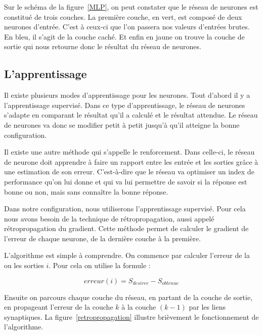 \documentclass[11pt]{report}
\begin{document}
Sur le schéma de la figure~\ref{MLP}, on peut constater que le réseau de neurones est constitué de trois couches. La première couche, en vert, est composé de deux neurones d'entrée. C'est à ceux-ci que l'on passera nos valeurs d'entrées brutes. En bleu, il s'agit de la couche caché. Et enfin en jaune on trouve la couche de sortie qui nous retourne donc le résultat du réseau de neurones.

\subsection{L'apprentissage}

Il existe plusieurs modes d'apprentissage pour les neurones. Tout d'abord il y a l'apprentissage supervisé. Dans ce type d'apprentissage, le réseau de neurones s'adapte en comparant le résultat qu'il a calculé et le résultat attendue. Le réseau de neurones va donc se modifier petit à petit jusqu'à qu'il atteigne la bonne configuration.

Il existe une autre méthode qui s'appelle le renforcement. Dans celle-ci, le réseau de neurone doit apprendre à faire un rapport entre les entrée et les sorties grâce à une estimation de son erreur. C'est-à-dire que le réseau va optimiser un index de performance qu'on lui donne et qui va lui permettre de savoir si la réponse est bonne ou non, mais sans connaître la  bonne réponse.

Dans notre configuration, nous utiliserons l'apprentissage supervisé. Pour cela nous avons besoin de la technique de rétropropagation, aussi appelé rétropropagation du gradient. Cette méthode permet de calculer le gradient de l'erreur de chaque neurone, de la dernière couche à la première.

L'algorithme est simple à comprendre. On commence par calculer l'erreur de la ou les sorties $i$. Pour cela on utilise la formule :

\[ erreur(i) = S_{desiree} - S_{obtenue} \]

Ensuite on parcours chaque couche du réseau, en partant de la couche de sortie, en propageant l'erreur de la couche $k$ à la couche $(k-1)$ par les liens synaptiques. La figure~\ref{retropropagation} illustre brièvement le fonctionnement de l'algorithme.
\end{document}
